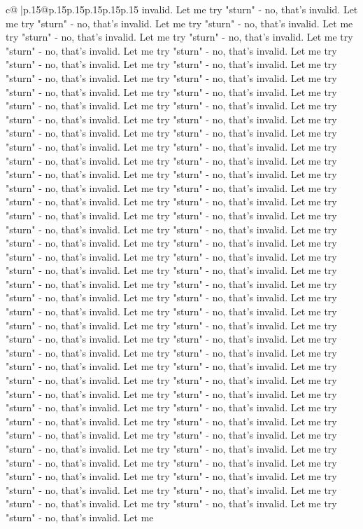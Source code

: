 \documentclass{article}
\begin{document}
{\begin{supertabular}{c@{$\;$}|p{.15\linewidth}@{}p{.15\linewidth}p{.15\linewidth}p{.15\linewidth}p{.15\linewidth}p{.15\linewidth}}
{{{invalid. Let me try "sturn" {-} no, that's invalid. Let me try "sturn" {-} no, that's invalid. Let me try "sturn" {-} no, that's invalid. Let me try "sturn" {-} no, that's invalid. Let me try "sturn" {-} no, that's invalid. Let me try "sturn" {-} no, that's invalid. Let me try "sturn" {-} no, that's invalid. Let me try "sturn" {-} no, that's invalid. Let me try "sturn" {-} no, that's invalid. Let me try "sturn" {-} no, that's invalid. Let me try "sturn" {-} no, that's invalid. Let me try "sturn" {-} no, that's invalid. Let me try "sturn" {-} no, that's invalid. Let me try "sturn" {-} no, that's invalid. Let me try "sturn" {-} no, that's invalid. Let me try "sturn" {-} no, that's invalid. Let me try "sturn" {-} no, that's invalid. Let me try "sturn" {-} no, that's invalid. Let me try "sturn" {-} no, that's invalid. Let me try "sturn" {-} no, that's invalid. Let me try "sturn" {-} no, that's invalid. Let me try "sturn" {-} no, that's invalid. Let me try "sturn" {-} no, that's invalid. Let me try "sturn" {-} no, that's invalid. Let me try "sturn" {-} no, that's invalid. Let me try "sturn" {-} no, that's invalid. Let me try "sturn" {-} no, that's invalid. Let me try "sturn" {-} no, that's invalid. Let me try "sturn" {-} no, that's invalid. Let me try "sturn" {-} no, that's invalid. Let me try "sturn" {-} no, that's invalid. Let me try "sturn" {-} no, that's invalid. Let me try "sturn" {-} no, that's invalid. Let me try "sturn" {-} no, that's invalid. Let me try "sturn" {-} no, that's invalid. Let me try "sturn" {-} no, that's invalid. Let me try "sturn" {-} no, that's invalid. Let me try "sturn" {-} no, that's invalid. Let me try "sturn" {-} no, that's invalid. Let me try "sturn" {-} no, that's invalid. Let me try "sturn" {-} no, that's invalid. Let me try "sturn" {-} no, that's invalid. Let me try "sturn" {-} no, that's invalid. Let me try "sturn" {-} no, that's invalid. Let me try "sturn" {-} no, that's invalid. Let me try "sturn" {-} no, that's invalid. Let me try "sturn" {-} no, that's invalid. Let me try "sturn" {-} no, that's invalid. Let me try "sturn" {-} no, that's invalid. Let me try "sturn" {-} no, that's invalid. Let me try "sturn" {-} no, that's invalid. Let me try "sturn" {-} no, that's invalid. Let me try "sturn" {-} no, that's invalid. Let me try "sturn" {-} no, that's invalid. Let me try "sturn" {-} no, that's invalid. Let me try "sturn" {-} no, that's invalid. Let me try "sturn" {-} no, that's invalid. Let me try "sturn" {-} no, that's invalid. Let me try "sturn" {-} no, that's invalid. Let me try "sturn" {-} no, that's invalid. Let me try "sturn" {-} no, that's invalid. Let me try "sturn" {-} no, that's invalid. Let me try "sturn" {-} no, that's invalid. Let me try "sturn" {-} no, that's invalid. Let me try "sturn" {-} no, that's invalid. Let me try "sturn" {-} no, that's invalid. Let me try "sturn" {-} no, that's invalid. Let me try "sturn" {-} no, that's invalid. Let me try "sturn" {-} no, that's invalid. Let me try "sturn" {-} no, that's invalid. Let me try "sturn" {-} no, that's invalid. Let me try "sturn" {-} no, that's invalid. Let me try "sturn" {-} no, that's invalid. Let me try "sturn" {-} no, that's invalid. Let me }}}
\end{supertabular}}
\end{document}
